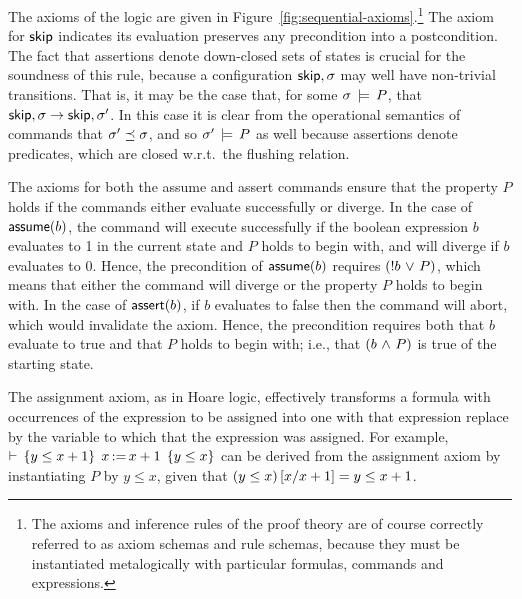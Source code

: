 \documentclass[11pt]{report}
\begin{document}
The axioms of the logic are given in Figure~\ref{fig:sequential-axioms}.\footnote{The axioms and inference rules of the proof theory are of course correctly referred to as axiom schemas and rule schemas, because they must be instantiated metalogically with particular formulas, commands and expressions.} The axiom for $\operatorname{\mathsf{skip}}$ indicates its evaluation preserves any precondition into a postcondition. The fact that assertions denote down-closed sets of states is crucial for the soundness of this rule, because a configuration $\operatorname{\mathsf{skip}},\sigma$ may well have non-trivial transitions. That is, it may be the case that, for some $\sigma \,\models\, P$, that $\operatorname{\mathsf{skip}},\sigma \rightarrow \operatorname{\mathsf{skip}},\sigma'$. In this case it is clear from the operational semantics of commands that $\sigma' \preceq \sigma$, and so $\sigma' \,\models\, P$ as well because assertions denote predicates, which are closed w.r.t.\ the flushing relation. 

The axioms for both the assume and assert commands ensure that the property $P$ holds if the commands either evaluate successfully or diverge. In the case of $\operatorname{\mathsf{assume}}(b)$, the command will execute successfully if the boolean expression $b$ evaluates to 1 in the current state and $P$ holds to begin with, and will diverge if $b$ evaluates to 0. Hence, the precondition of $\operatorname{\mathsf{assume}}(b)$ requires $(!b \operatorname{\,\vee\,} P)$, which means that either the command will diverge or the property $P$ holds to begin with. In the case of $\operatorname{\mathsf{assert}}(b)$, if $b$ evaluates to false then the command will abort, which would invalidate the axiom. Hence, the precondition requires both that $b$ evaluate to true and that $P$ holds to begin with; i.e., that $(b \operatorname{\,\wedge\,} P)$ is true of the starting state. 

The assignment axiom, as in Hoare logic, effectively transforms a formula with occurrences of the expression to be assigned into one with that expression replace by the variable to which that the expression was assigned. For example, $\vdash\,\left\lbrace y \leq x+1 \right\rbrace\;x \operatorname{:\!=} x+1\;\left\lbrace y \leq x \right\rbrace$ can be derived from the assignment axiom by instantiating $P$ by $y \leq x$, given that $(y \leq x)\left[x / x+1\right] = y \leq x+1$. 
\end{document}
